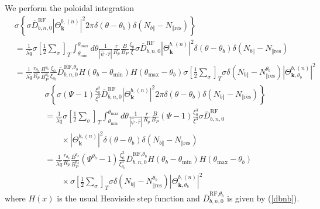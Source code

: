 We perform the poloidal integration
\begin{align}
&  \sigma\left\{  \sigma\overline{D}_{b,n,0}^{\text{RF}}\left|  \Theta
_{\mathbf{k}}^{b,\left(  n\right)  }\right|  ^{2}2\pi\delta\left(
\theta-\theta_{b}\right)  \delta\left(  N_{b\Vert}-N_{\Vert\text{res}}\right)
\right\}  \nonumber\\
&  =\frac{1}{\lambda\widetilde{q}}\sigma\left[  \frac{1}{2}\sum\limits_{\sigma
}\right]  _{T}\int_{\theta_{\min}}^{\theta_{\max}}d\theta\frac{1}{\left|
\widehat{\psi}\cdot\widehat{r}\right|  }\frac{r}{R_{p}}\frac{B}{B_{P}}%
\frac{\xi_{0}}{\xi}\sigma\overline{D}_{b,n,0}^{\text{RF}}\left|
\Theta_{\mathbf{k}}^{b,\left(  n\right)  }\right|  ^{2}\delta\left(
\theta-\theta_{b}\right)  \delta\left(  N_{b\Vert}-N_{\Vert\text{res}}\right)
\nonumber\\
&  =\frac{1}{\lambda\widetilde{q}}\frac{r_{\theta_{b}}}{R_{p}}\frac
{B^{\theta_{b}}}{B_{P}^{\theta_{b}}}\frac{\xi_{0}}{\xi_{\theta_{b}}}%
\overline{D}_{b,n,0}^{\text{RF,}\theta_{b}}H\left(  \theta_{b}-\theta_{\min
}\right)  H\left(  \theta_{\max}-\theta_{b}\right)  \sigma\left[  \frac{1}%
{2}\sum\limits_{\sigma}\right]  _{T}\sigma\delta\left(  N_{b\Vert}%
-N_{\Vert\text{res}}^{\theta_{b}}\right)  \left|  \Theta_{\mathbf{k,}%
\theta_{b}}^{b,\left(  n\right)  }\right|  ^{2}%
\end{align}%
\begin{align}
&  \sigma\left\{  \sigma\left(  \Psi-1\right)  \frac{\xi_{0}^{2}}{\xi^{2}%
}\overline{D}_{b,n,0}^{\text{RF}}\left|  \Theta_{\mathbf{k}}^{b,\left(
n\right)  }\right|  ^{2}2\pi\delta\left(  \theta-\theta_{b}\right)
\delta\left(  N_{b\Vert}-N_{\Vert\text{res}}\right)  \right\}  \nonumber\\
&  =\frac{1}{\lambda\widetilde{q}}\sigma\left[  \frac{1}{2}\sum\limits_{\sigma
}\right]  _{T}\int_{\theta_{\min}}^{\theta_{\max}}d\theta\frac{1}{\left|
\widehat{\psi}\cdot\widehat{r}\right|  }\frac{r}{R_{p}}\frac{B}{B_{P}}\left(
\Psi-1\right)  \frac{\xi_{0}^{3}}{\xi^{3}}\sigma\overline{D}_{b,n,0}%
^{\text{RF}} \nonumber\\
&\qquad\times\left|  \Theta_{\mathbf{k}}^{b,\left(  n\right)
}\right|
^{2}\delta\left(  \theta-\theta_{b}\right)  \delta\left(  N_{b\Vert}%
-N_{\Vert\text{res}}\right)  \nonumber\\
&  =\frac{1}{\lambda\widetilde{q}}\frac{r_{\theta_{b}}}{R_{p}}\frac
{B^{\theta_{b}}}{B_{P}^{\theta_{b}}}\left(  \Psi^{\theta_{b}}-1\right)
\frac{\xi_{0}^{3}}{\xi_{\theta_{b}}^{3}}\overline{D}_{b,n,0}^{\text{RF,}%
\theta_{b}}H\left(  \theta_{b}-\theta_{\min}\right)  H\left(  \theta_{\max
}-\theta_{b}\right) \nonumber\\
&\qquad\times \sigma\left[  \frac{1}{2}\sum\limits_{\sigma}\right]
_{T}\sigma\delta\left(
N_{b\Vert}-N_{\Vert\text{res}}^{\theta_{b}}\right)
\left|  \Theta_{\mathbf{k,}\theta_{b}}^{b,\left(  n\right)  }\right|  ^{2}%
\end{align}
where $H\left(  x\right)  $ is the usual Heaviside step function and
$\overline{D}_{b,n,0}^{\text{RF,}\theta_{b}}$ is given by (\ref{dbnb}).

